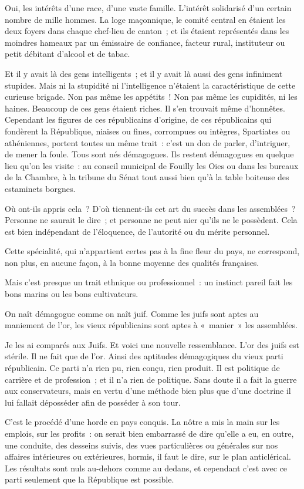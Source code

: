 \documentclass[french,twoside]{book} %
\newcommand{\astermono}{\medskip\centerline{\color{rubric}\large\selectfont{\syms ✻}}\medskip\par}%
\begin{document}
\astermono

\noindent Oui, les intérêts d’une race, d’une vaste famille. L’intérêt solidarisé d’un certain nombre de mille hommes. La loge maçonnique, le comité central en étaient les deux foyers dans chaque chef-lieu de canton ; et ils étaient représentés dans les moindres hameaux par un émissaire de confiance, facteur rural, instituteur ou petit débitant d’alcool et de tabac.\par
Et il y avait là des gens intelligents ; et il y avait là aussi des gens infiniment stupides. Mais ni la stupidité ni l’intelligence n’étaient la caractéristique de cette curieuse brigade. Non pas même les appétits ! Non pas même les cupidités, ni les haines. Beaucoup de ces gens étaient riches. Il s’en trouvait même d’honnêtes. Cependant les figures de ces républicains d’origine, de ces républicains qui fondèrent la République, niaises ou fines, corrompues ou intègres, Spartiates ou athéniennes, portent toutes un même trait : c’est un don de parler, d’intriguer, de mener la foule. Tous sont nés démagogues. Ils restent démagogues en quelque lieu qu’on les visite : au conseil municipal de Fouilly les Oies ou dans les bureaux de la Chambre, à la tribune du Sénat tout aussi bien qu’à la table boiteuse des estaminets borgnes.\par

\astermono

\noindent Où ont-ils appris cela ? D’où tiennent-ils cet art du succès dans les assemblées ? Personne ne saurait le dire ; et personne ne peut nier qu’ils ne le possèdent. Cela est bien indépendant de l’éloquence, de l’autorité ou du mérite personnel.\par
Cette spécialité, qui n’appartient certes pas à la fine fleur du pays, ne correspond, non plus, en aucune façon, à la bonne moyenne des qualités françaises.\par
Mais c’est presque un trait ethnique ou professionnel : un instinct pareil fait les bons marins ou les bons cultivateurs.\par
On naît démagogue comme on naît juif. Comme les juifs sont aptes au maniement de l’or, les vieux républicains sont aptes à « manier » les assemblées.\par
Je les ai comparés aux Juifs. Et voici une nouvelle ressemblance. L’or des juifs est stérile. Il ne fait que de l’or. Ainsi des aptitudes démagogiques du vieux parti républicain. Ce parti n’a rien pu, rien conçu, rien produit. Il est politique de carrière et de profession ; et il n’a rien de politique. Sans doute il a fait la guerre aux conservateurs, mais en vertu d’une méthode bien plus que d’une doctrine il lui fallait déposséder afin de posséder à son tour.\par
C’est le procédé d’une horde en pays conquis. La nôtre a mis la main sur les emplois, sur les profits : on serait bien embarrassé de dire qu’elle a eu, en outre, une conduite, des desseins suivis, des vues particulières ou générales sur nos affaires intérieures ou extérieures, hormis, il faut le dire, sur le plan anticlérical. Les résultats sont nuls au-dehors comme au dedans, et cependant c’est avec ce parti seulement que la République est possible.\par
\end{document}
